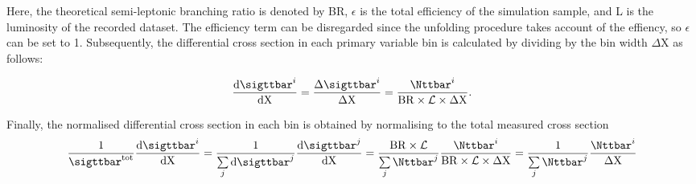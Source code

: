 Here, the theoretical \ttbar semi-leptonic branching ratio is denoted by BR, $\epsilon$ is the total
efficiency of the \ttbar simulation sample, and  {\cal L} is the luminosity of the recorded dataset. The
efficiency term can be disregarded since the unfolding procedure takes account of the effiency, so $\epsilon$
can be set to 1. Subsequently, the differential cross section in each primary variable bin is
calculated by dividing by the bin width $\Delta \mathrm{X}$ as follows:

\begin{equation}
\frac{\mathrm{d}\sigttbar^i}{\mathrm{d} \mathrm{X}} =
\frac{\Delta\sigttbar^i}{\Delta \mathrm{X} } = \frac{\Nttbar^i}{\mathrm{BR} \times {\cal L} \times \Delta
\mathrm{X}} .
\end{equation}

Finally, the normalised differential cross section in each bin is obtained by normalising to the total
measured cross section
\begin{equation}
\label{eq:normalisedxs}
\frac{1}{\sigttbar^\mathrm{tot}} \frac{\mathrm{d}\sigttbar^i}{\mathrm{d} \mathrm{X}} =
\frac{1}{\sum\limits_{j}{\mathrm{d}\sigttbar^j}} \frac{\mathrm{d}\sigttbar^j}{\mathrm{d} \mathrm{X}} =
\frac{\mathrm{BR} \times {\cal L}}{\sum\limits_{j}{\Nttbar^j}}\frac{\Nttbar^i}{\mathrm{BR} \times {\cal L} \times \Delta
\mathrm{X}} = \frac{1}{\sum\limits_{j}{\Nttbar^j}}\frac{\Nttbar^i}{\Delta\mathrm{X}}
\end{equation}
		